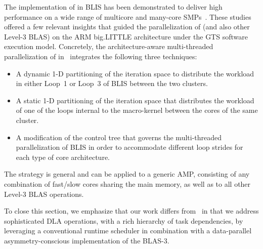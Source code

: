 The implementation of \gemm in BLIS has been demonstrated to deliver high performance on a wide
range of multicore and many-core SMPs~\cite{BLIS2,BLIS3}. These studies offered a few relevant
insights that guided the parallelization of \gemm (and also other Level-3 BLAS) on the ARM big.LITTLE architecture under the GTS software execution model.
Concretely, the architecture-aware 
multi-threaded parallelization of \gemm in~\cite{asymBLIS} integrates the following three techniques:
\begin{itemize}
\item A dynamic 1-D partitioning of the iteration space to distribute the workload in
      either Loop~1 or Loop~3 of BLIS \gemm between the two clusters.
\item A static 1-D partitioning of the iteration space that distributes the workload of one of the loops 
      internal to the macro-kernel between the cores of the same cluster.
\item A modification of the control tree that governs the multi-threaded parallelization of BLIS \gemm in order to
      accommodate different loop strides for each type of core architecture.
\end{itemize}

The strategy is general and can be applied to a generic AMP,
consisting of any combination of fast/slow cores sharing the main memory, 
as well as to all other Level-3 BLAS operations.

To close this section, we emphasize that 
our work differs from~\cite{asymBLIS,OmpSsbigLITTLE} in that we address sophisticated DLA operations, 
with a rich hierarchy of task dependencies, by leveraging a conventional runtime scheduler in combination with
a data-parallel asymmetry-conscious implementation of the BLAS-3.
